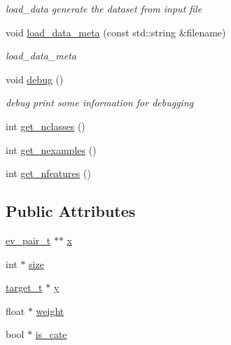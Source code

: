 \begin{DoxyCompactItemize}
\begin{DoxyCompactList}\small\item\em load\+\_\+data generate the dataset from input file \end{DoxyCompactList}\item 
void \hyperlink{classdataset_aeab51be94fab1f62e901555c82a016ae}{load\+\_\+data\+\_\+meta} (const std\+::string \&filename)
\begin{DoxyCompactList}\small\item\em load\+\_\+data\+\_\+meta \end{DoxyCompactList}\item 
void \hyperlink{classdataset_aeca876714406b8e391ab8cdeb31c9f3f}{debug} ()
\begin{DoxyCompactList}\small\item\em debug print some information for debugging \end{DoxyCompactList}\item 
int \hyperlink{classdataset_a35b101f3d8aecd5d87820982718f1534}{get\+\_\+nclasses} ()
\item 
int \hyperlink{classdataset_acd3afb9c245b9e11a6ed53ea293257a9}{get\+\_\+nexamples} ()
\item 
int \hyperlink{classdataset_a956095a460089726c8f39b3de8d4173d}{get\+\_\+nfeatures} ()
\end{DoxyCompactItemize}
\subsection*{Public Attributes}
\begin{DoxyCompactItemize}
\item 
\hyperlink{structev__pair__t}{ev\+\_\+pair\+\_\+t} $\ast$$\ast$ \hyperlink{classdataset_af7977ae76ce8f573f349e63f6500a8f8}{x}
\item 
int $\ast$ \hyperlink{classdataset_acc18732fc7fbc0fcdebffac620646eb9}{size}
\item 
\hyperlink{dataset_8h_a0f180d1f400ce1743488c55eb82a0a49}{target\+\_\+t} $\ast$ \hyperlink{classdataset_a146d2d2d0eaadeb342e76b9bb1004881}{y}
\item 
float $\ast$ \hyperlink{classdataset_ac6690ca832182b7cfa64da93a6ccd6ab}{weight}
\item 
bool $\ast$ \hyperlink{classdataset_ab856d84d4bced1ccde106badfab229d8}{is\+\_\+cate}
\end{DoxyCompactItemize}
